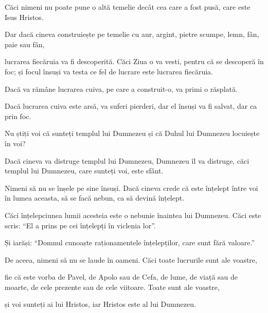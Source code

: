 {Căci nimeni nu poate pune o altă temelie decât cea care a fost pusă, care este Isus Hristos.

Dar dacă cineva construiește pe temelie cu aur, argint, pietre scumpe, lemn, fân, paie sau fân,

lucrarea fiecăruia va fi descoperită. Căci Ziua o va vesti, pentru că se descoperă în foc; și focul însuși va testa ce fel de lucrare este lucrarea fiecăruia.

Dacă va rămâne lucrarea cuiva, pe care a construit-o, va primi o răsplată.

Dacă lucrarea cuiva este arsă, va suferi pierderi, dar el însuși va fi salvat, dar ca prin foc.


\par }{\PP {}Nu știți voi că sunteți templul lui Dumnezeu și că Duhul lui Dumnezeu locuiește în voi?

Dacă cineva va distruge templul lui Dumnezeu, Dumnezeu îl va distruge, căci templul lui Dumnezeu, care sunteți voi, este sfânt.


\par }{\PP {}Nimeni să nu se înșele pe sine însuși. Dacă cineva crede că este înțelept între voi în lumea aceasta, să se facă nebun, ca să devină înțelept.

Căci înțelepciunea lumii acesteia este o nebunie înaintea lui Dumnezeu. Căci este scris: “El a prins pe cei înțelepți în viclenia lor”.

Și iarăși: “Domnul cunoaște raționamentele înțelepților, care sunt fără valoare.”

De aceea, nimeni să nu se laude în oameni. Căci toate lucrurile sunt ale voastre,

fie că este vorba de Pavel, de Apolo sau de Cefa, de lume, de viață sau de moarte, de cele prezente sau de cele viitoare. Toate sunt ale voastre,

și voi sunteți ai lui Hristos, iar Hristos este al lui Dumnezeu.



\par }
